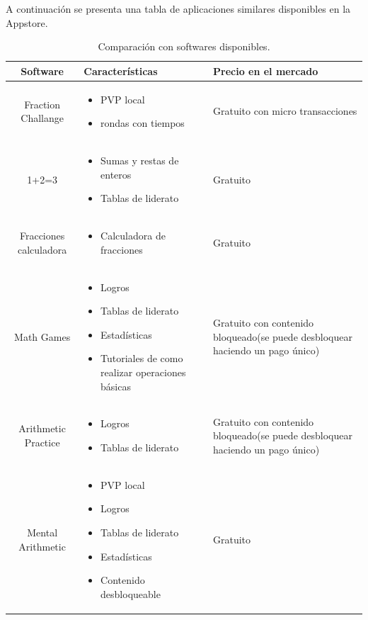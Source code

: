 \documentclass{article}
\begin{document}
A continuación se presenta una tabla de aplicaciones similares disponibles en la Appstore.
\begin{table}[H]
\centering
\begin{tabular}{|c|M{6cm}|M{5cm}|}
\hline
Software & Características & Precio en el mercado \\ \hline

Fraction Challange & 
\begin{itemize}
	\item PVP local
	\item rondas con tiempos
\end{itemize} & 
Gratuito con micro transacciones \\ \hline


1+2=3 & 
\begin{itemize}
	\item Sumas y restas de enteros
	\item Tablas de liderato 
\end{itemize}& 
Gratuito \\ \hline


Fracciones calculadora & 
\begin{itemize}
	\item Calculadora de fracciones
\end{itemize}& 
Gratuito \\ \hline


Math Games & 
\begin{itemize}
	\item Logros
	\item Tablas de liderato
	\item Estadísticas
	\item Tutoriales de como realizar operaciones básicas
\end{itemize} & 
Gratuito con contenido bloqueado(se puede desbloquear haciendo un pago único) \\ \hline

Arithmetic Practice & 
\begin{itemize}
	\item Logros
	\item Tablas de liderato
\end{itemize} & 
Gratuito con contenido bloqueado(se puede desbloquear haciendo un pago único) \\ \hline


Mental Arithmetic  & 
\begin{itemize}
	\item PVP local
	\item Logros
	\item Tablas de liderato
	\item Estadísticas
	\item Contenido desbloqueable
\end{itemize} & 
Gratuito \\ \hline

\end{tabular}
\label{tab:software}
\caption{Comparación con softwares disponibles.}
\end{table}
\end{document}
